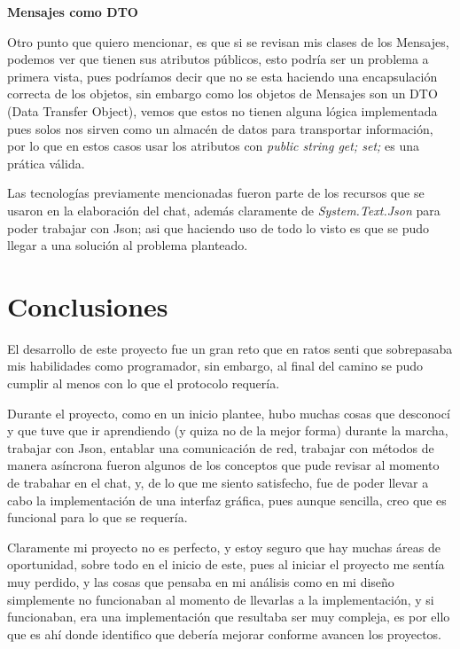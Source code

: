 \documentclass[10pt,letterpaper]{report}
\begin{document}
    \vspace{0.3cm}

    \noindent \textbf{Mensajes como DTO}
        
     \noindent Otro punto que quiero mencionar, es que si se revisan mis clases de los Mensajes, podemos ver que tienen sus atributos públicos, esto podría ser un problema a primera vista, pues podríamos decir que no se esta haciendo una encapsulación correcta de los objetos, sin embargo como los objetos de Mensajes son un DTO (Data Transfer Object), vemos que estos no tienen alguna lógica implementada pues solos nos sirven como un almacén de datos para transportar información, por lo que en estos casos usar los atributos con \textit{public string {get; set;}} es una prática válida.

    \vspace{0.3cm}
    
    \noindent Las tecnologías previamente mencionadas fueron parte de los recursos que se usaron en la elaboración del chat, además claramente de \textit{System.Text.Json} para poder trabajar con Json; asi que haciendo uso de todo lo visto es que se pudo llegar a una solución al problema planteado.

    \chapter{Conclusiones}

    \noindent El desarrollo de este proyecto fue un gran reto que en ratos senti que sobrepasaba mis habilidades como programador, sin embargo, al final del camino se pudo cumplir al menos con lo que el protocolo requería.

    \noindent Durante el proyecto, como en un inicio plantee, hubo muchas cosas que desconocí y que tuve que ir aprendiendo (y quiza no de la mejor forma) durante la marcha, trabajar con Json, entablar una comunicación de red, trabajar con métodos de manera asíncrona fueron algunos de los conceptos que pude revisar al momento de trabahar en el chat, y, de lo que me siento satisfecho, fue de poder llevar a cabo la implementación de una interfaz gráfica, pues aunque sencilla, creo que es funcional para lo que se requería.

    \vspace{0.2 cm}

    \noindent Claramente mi proyecto no es perfecto, y estoy seguro que hay muchas áreas de oportunidad, sobre todo en el inicio de este, pues al iniciar el proyecto me sentía muy perdido, y las cosas que pensaba en mi análisis como en mi diseño simplemente no funcionaban al momento de llevarlas a la implementación, y si funcionaban, era una implementación que resultaba ser muy compleja, es por ello que es ahí donde identifico que debería mejorar conforme avancen los proyectos.
\end{document}
